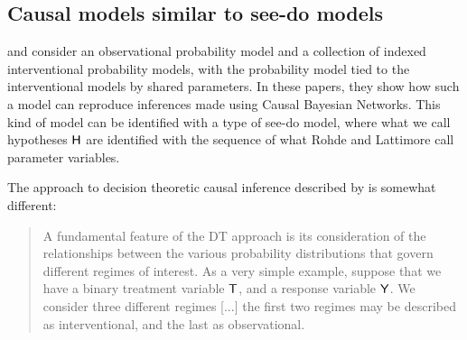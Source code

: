 

\subsection{Causal models similar to see-do models}

\citet{lattimore_causal_2019} and \citet{lattimore_replacing_2019} consider an observational probability model and a collection of indexed interventional probability models, with the probability model tied to the interventional models by shared parameters. In these papers, they show how such a model can reproduce inferences made using Causal Bayesian Networks. This kind of model can be identified with a type of see-do model, where what we call hypotheses $\mathsf{H}$ are identified with the sequence of what Rohde and Lattimore call parameter variables.

The approach to decision theoretic causal inference described by \citet{dawid_decision-theoretic_2020} is somewhat different:

\begin{quote}
A fundamental feature of the DT approach is its consideration of the relationships between the various probability distributions that govern different regimes of interest. As a very simple example, suppose that we have a binary treatment variable $\mathsf{T}$, and a response variable $\mathsf{Y}$. We consider three different regimes [...] the first two regimes may be described as interventional, and the last as observational.
\end{quote}

